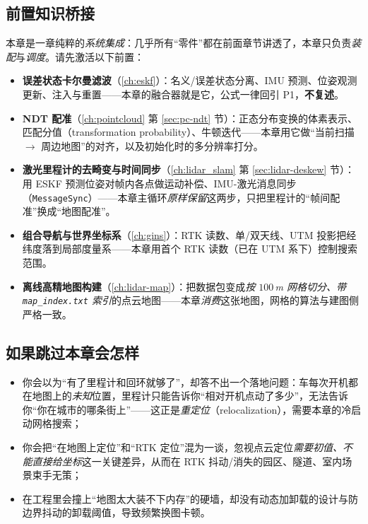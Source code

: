 \subsection*{前置知识桥接}
本章是一章纯粹的\emph{系统集成}：几乎所有“零件”都在前面章节讲透了，本章只负责\emph{装配}与\emph{调度}。请先激活以下前置：
\begin{itemize}
  \item \textbf{误差状态卡尔曼滤波}（\cref{ch:eskf}）：名义/误差状态分离、IMU 预测、位姿观测更新、注入与重置——本章的融合器就是它，公式一律回引 P1，\textbf{不复述}。
  \item \textbf{NDT 配准}（\cref{ch:pointcloud} 第 \ref{sec:pc-ndt} 节）：正态分布变换的体素表示、匹配分值（transformation probability）、牛顿迭代——本章用它做“当前扫描 $\to$ 周边地图”的对齐，以及初始化时的多分辨率打分。
  \item \textbf{激光里程计的去畸变与时间同步}（\cref{ch:lidar_slam} 第 \ref{sec:lidar-deskew} 节）：用 ESKF 预测位姿对帧内各点做运动补偿、IMU-激光消息同步（\texttt{MessageSync}）——本章主循环\emph{原样保留}这两步，只把里程计的“帧间配准”换成“地图配准”。
  \item \textbf{组合导航与世界坐标系}（\cref{ch:gins}）：RTK 读数、单/双天线、UTM 投影把经纬度落到局部度量系——本章用首个 RTK 读数（已在 UTM 系下）控制搜索范围。
  \item \textbf{离线高精地图构建}（\cref{ch:lidar-map}）：把数据包变成\emph{按 $100$\,m 网格切分、带 \texttt{map\_index.txt} 索引}的点云地图——本章\emph{消费}这张地图，网格的算法与建图侧严格一致。
\end{itemize}

\subsection*{如果跳过本章会怎样}
\begin{itemize}
  \item 你会以为“有了里程计和回环就够了”，却答不出一个落地问题：车每次开机都在地图上的\emph{未知}位置，里程计只能告诉你“相对开机点动了多少”，无法告诉你“你在城市的哪条街上”——这正是\emph{重定位}（relocalization），需要本章的冷启动网格搜索；
  \item 你会把“在地图上定位”和“RTK 定位”混为一谈，忽视点云定位\emph{需要初值、不能直接给坐标}这一关键差异，从而在 RTK 抖动/消失的园区、隧道、室内场景束手无策；
  \item 在工程里会撞上“地图太大装不下内存”的硬墙，却没有动态加卸载的设计与防边界抖动的卸载阈值，导致频繁换图卡顿。
\end{itemize}

